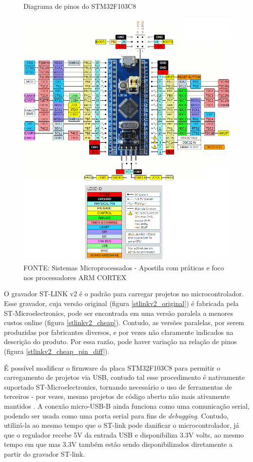 \begin{figure}[ht]
	\centering
	\caption{Diagrama de pinos do STM32F103C8}
	\includegraphics[width=1.0\textwidth]{figures/stm32f1_pinout}
	\caption*{FONTE: Sistemas Microprocessados - Apostila com práticas e foco nos processadores ARM CORTEX \cite{apostila_microprossados}}
    \label{stm32f103c8_pinout}
\end{figure}

O gravador ST-LINK v2 é o padrão para carregar projetos no microcontrolador.
Esse gravador, cuja versão original (figura \ref{stlinkv2_original}) é fabricada
pela ST-Microelectronics, pode ser encontrada em uma versão paralela a menores
custos online (figura \ref{stlinkv2_cheap}). Contudo, as versões paralelas, por
serem produzidas por fabricantes diversos, e por vezes não claramente indicados 
na descrição do produto. Por essa razão, pode haver variação na relação de
pinos (figura \ref{stlinkv2_cheap_pin_diff}).

É possível modificar o firmware da placa STM32F103C8 para permitir o
carregamento de projetos via USB, contudo tal esse procedimento
é nativamente suportado ST-Microelectronics, tornando necessário o uso de
ferramentas de terceiros - por vezes, mesmo projetos de código aberto não mais
ativamente mantidos \cite{stm32duino_bootloader}.
A conexão micro-USB-B ainda funciona como uma comunicação serial, podendo ser
usada como uma porta serial para fins de \textit{debugging}. Contudo, utilizá-la
ao mesmo tempo que o ST-link pode danificar o microcontrolador, já que o
regulador recebe 5V da entrada USB e disponibiliza 3.3V volts, ao mesmo tempo
em que mas 3.3V também estão sendo disponibilizados diretamente a partir do
gravador ST-link.


